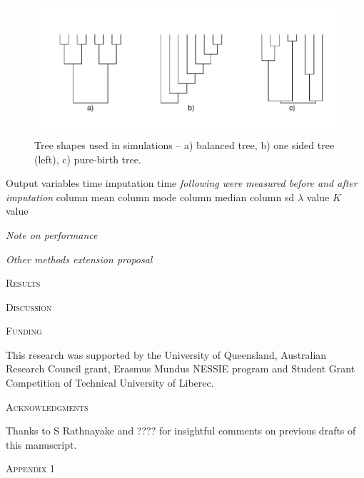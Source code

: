 \documentclass[hidelinks,a4paper]{article}
\renewcommand{\section}[1]{%
\bigskip
\begin{center}
\begin{Large}
\normalfont\scshape #1
\medskip
\end{Large}
\end{center}}
\renewcommand{\subsection}[1]{%
\bigskip
\begin{center}
\begin{large}
\normalfont\itshape #1
\end{large}
\end{center}}
\begin{document}
\begin{figure}
	\centering
	\includegraphics{graphics/trees.pdf}
	\caption{Tree shapes used in simulations -- a) balanced tree, b) one sided tree (left), c) pure-birth tree.}
	\label{fig:treeShapes}
\end{figure}

\begin{multicols}{2}

Output variables
time
imputation time
\emph{following were measured before and after imputation}
column mean
column mode
column median
column sd
$\lambda$ value
$K$ value

\subsection{Note on performance}

\subsection{Other methods extension proposal}

\section{Results}

\section{Discussion}

\section{Funding}
This research was supported by the University of Queensland, Australian Research Council grant, Erasmus Mundus NESSIE program and Student Grant Competition of Technical University of Liberec.

\section{Acknowledgments}
Thanks to S Rathnayake and ???? for insightful comments on previous drafts of this manuscript.

\renewcommand{\refname}{
\bigskip
\begin{center}
\begin{Large}
\normalfont\scshape References
\medskip
\end{Large}
\end{center}
}




\end{multicols}

\appendix
\renewcommand{\theequation}{A1.\arabic{equation}}
\setcounter{equation}{0}
\section{Appendix 1}
\end{document}
